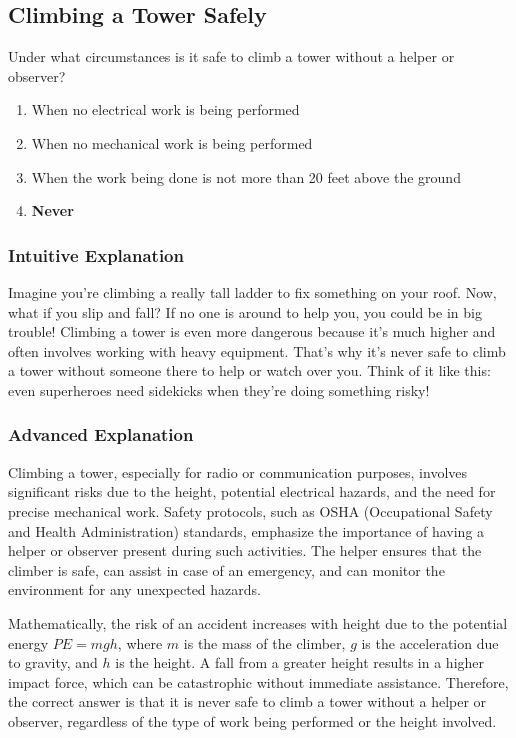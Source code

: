 \subsection{Climbing a Tower Safely}
\label{T0B03}

\begin{tcolorbox}[colback=gray!10!white,colframe=black!75!black,title=T0B03]
Under what circumstances is it safe to climb a tower without a helper or observer?
\begin{enumerate}[label=\Alph*)]
    \item When no electrical work is being performed
    \item When no mechanical work is being performed
    \item When the work being done is not more than 20 feet above the ground
    \item \textbf{Never}
\end{enumerate}
\end{tcolorbox}

\subsubsection{Intuitive Explanation}
Imagine you're climbing a really tall ladder to fix something on your roof. Now, what if you slip and fall? If no one is around to help you, you could be in big trouble! Climbing a tower is even more dangerous because it's much higher and often involves working with heavy equipment. That's why it's never safe to climb a tower without someone there to help or watch over you. Think of it like this: even superheroes need sidekicks when they're doing something risky!

\subsubsection{Advanced Explanation}
Climbing a tower, especially for radio or communication purposes, involves significant risks due to the height, potential electrical hazards, and the need for precise mechanical work. Safety protocols, such as OSHA (Occupational Safety and Health Administration) standards, emphasize the importance of having a helper or observer present during such activities. The helper ensures that the climber is safe, can assist in case of an emergency, and can monitor the environment for any unexpected hazards. 

Mathematically, the risk of an accident increases with height due to the potential energy \( PE = mgh \), where \( m \) is the mass of the climber, \( g \) is the acceleration due to gravity, and \( h \) is the height. A fall from a greater height results in a higher impact force, which can be catastrophic without immediate assistance. Therefore, the correct answer is that it is never safe to climb a tower without a helper or observer, regardless of the type of work being performed or the height involved.

